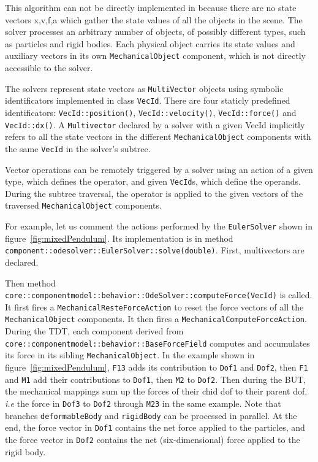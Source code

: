This algorithm can not be directly implemented in \sofa because there are no state vectors x,v,f,a which gather the state values of all the objects in the scene. 
The solver processes an arbitrary number of objects, of possibly different types, such as particles and rigid bodies. Each physical object carries its state values and auxiliary vectors in its own \texttt{MechanicalObject} component, which is not directly accessible to the solver.

The solvers represent state vectors as \texttt{MultiVector} objects using symbolic identificators implemented in class \texttt{VecId}.
There are four staticly predefined identificators: \texttt{VecId::position()}, \texttt{VecId::velocity()}, \texttt{VecId::force()} and \texttt{VecId::dx()}.
A \texttt{Multivector} declared by a solver with a given VecId implicitly refers to all the state vectors in the different \texttt{MechanicalObject} components with the same \texttt{VecId} in the solver's subtree.

Vector operations can be remotely triggered by a solver using an action of a given type, which defines the operator, and given \texttt{VecId}s, which define the operands.
During the subtree traversal, the operator is applied to the given vectors of the traversed \texttt{MechanicalObject} components.

For example, let us comment the actions performed by the \texttt{EulerSolver} shown in figure~\ref{fig:mixedPendulum}. Its implementation is in method \texttt{component::odesolver::EulerSolver::solve(double)}.
First, multivectors are declared. 

Then method \texttt{core::componentmodel::behavior::OdeSolver::computeForce(VecId)} is called. It first fires a \texttt{MechanicalResteForceAction} to reset the force vectors of all the \texttt{MechanicalObject} components. It then fires a  \texttt{MechanicalComputeForceAction}. During the TDT, each component derived from \texttt{core::componentmodel::behavior::BaseForceField} computes and accumulates its force in its sibling \texttt{MechanicalObject}. In the example shown in figure~\ref{fig:mixedPendulum}, \texttt{F13} adds its contribution to \texttt{Dof1} and \texttt{Dof2}, then \texttt{F1} and \texttt{M1} add their contributions to \texttt{Dof1}, then \texttt{M2} to \texttt{Dof2}. Then during the BUT, the mechanical mappings sum up the forces of their chid dof to their parent dof, \textit{i.e} the force in \texttt{Dof3} to \texttt{Dof2} through \texttt{M23} in the same example. 
Note that branches \texttt{deformableBody} and \texttt{rigidBody} can be processed in parallel.
At the end, the force vector in \texttt{Dof1} contains the net force applied to the particles, and the force vector in \texttt{Dof2} contains the net (six-dimensional) force applied to the rigid body. 

